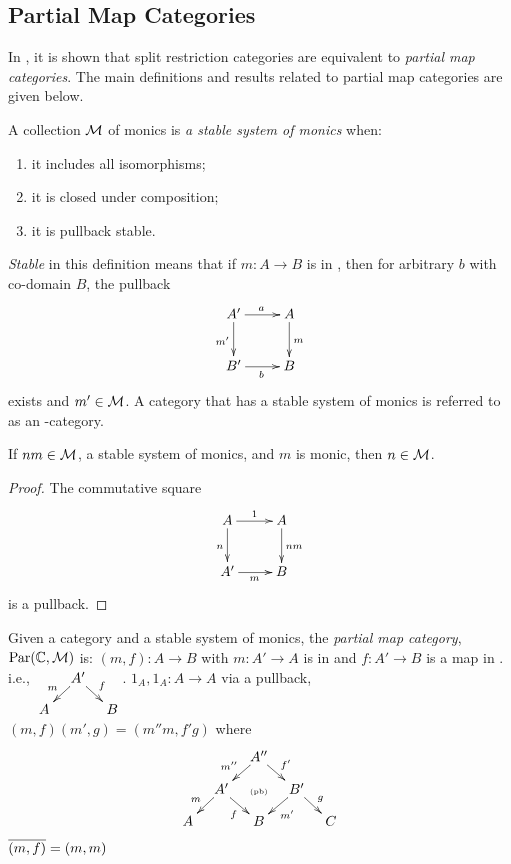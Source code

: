 \subsection{Partial Map Categories} %
\label{sub:partial_map_categories}

In \cite{cockett2002:restcategories1}, it is shown that split restriction categories are
equivalent to \emph{partial map categories}. The main definitions and results related to
partial map categories are given below.

\begin{definition}
  A collection $\mathcal{M}$ of monics is \emph{a stable system of monics}
  when:
  \begin{enumerate}[{(}i{)}]
    \item it includes all isomorphisms;
    \item it is closed under composition;
    \item it is pullback stable.
  \end{enumerate}
\end{definition}

\emph{Stable} in this definition means that if $m:A\to B$ is in \Mstab, then for arbitrary
$b$ with co-domain $B$, the pullback
\[
  \xymatrix{
    A'\ar[r]^a \ar[d]_{m'} &A\ar[d]^{m}\\
    B' \ar[r]_{b} & B
  }
\]
exists and $m' \in \mathcal{M}$. A category that has a stable system of monics
is referred to as an \Mstab-category.

\begin{lemma}
  If $n m \in \mathcal{M}$, a stable system of monics, and $m$ is monic, then $n \in \mathcal{M}$.
\end{lemma}
\begin{proof}
  The commutative square
  \[
    \xymatrix{
      A\ar[d]_n \ar[r]^{1} &A\ar[d]^{n m}\\
      A' \ar[r]_{m} & B
    }
  \]
  is a pullback.
\end{proof}

Given a category \C and a stable system of monics, the \emph{partial map category},
$\text{Par}(\mathbb{C},\mathcal{M})$ is:
    {$(m,f):A\to B$  with $m:A' \to A$ is in \Mstab and $f:A' \to B$ is a map in \C. i.e.,
      $\xymatrix @R-15pt @C-15pt{&A'\ar[dl]_{m} \ar[dr]^{f}\\A&&B}$.}
    {$1_A,1_A:A \to A$}
    {via a pullback, $(m,f)(m',g) = (m'' m, f' g)$ where
      \[
        \xymatrix @C-15pt @R-15pt{
          &&A''\ar[dl]_{m''}\ar[dr]^{f'}\\
          &A'\ar[dl]_{m}\ar[dr]_{f}&\text{{\tiny (pb)}}&B'\ar[dl]^{m'}\ar[dr]^{g}\\
          A&&B&&C
        }
      \]
    }
    {$\overline{(m,f)} = (m,m)$}

